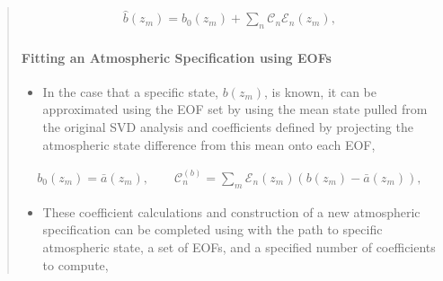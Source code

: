 \documentclass[letterpaper,10pt,english]{sphinxmanual}
\begin{document}
\begin{itemize}
\begin{quote}
\begin{itemize}
\end{itemize}
\begin{equation*}
\begin{split}\hat{b} \left( z_m \right) = b_0 \left( z_m \right) + \sum_n{ \mathcal{C}_n \mathcal{E}_n \left( z_m \right)},\end{split}
\end{equation*}

\paragraph{Fitting an Atmospheric Specification using EOFs}
\label{\detokenize{sampling:fitting-an-atmospheric-specification-using-eofs}}\begin{itemize}
\item {} 
In the case that a specific state, \(b \left(z_m \right)\), is known, it can be approximated using the EOF set by using the mean state pulled from the original SVD analysis and coefficients defined by projecting the atmospheric state difference from this mean onto each EOF,

\end{itemize}
\begin{equation*}
\begin{split}b_0 \left( z_m \right) = \bar{a}  \left( z_m \right) , \quad \quad \mathcal{C}_n^{(b)} = \sum_m{\mathcal{E}_n \left( z_m \right) \left( b \left( z_m \right) - \bar{a} \left( z_m \right) \right)},\end{split}
\end{equation*}\begin{itemize}
\item {} 
These coefficient calculations and construction of a new atmospheric specification can be completed using  with the path to specific atmospheric state, a set of EOFs, and a specified number of coefficients to compute,

\end{itemize}

\begin{sphinxVerbatim}[commandchars=\\\{\}]
  
  


\end{sphinxVerbatim}
\end{quote}
\end{itemize}
\end{document}
